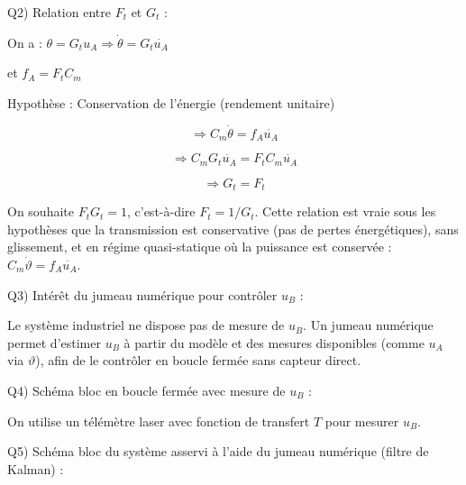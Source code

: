 \documentclass{rapportECL}
\begin{document}
Q2) Relation entre $F_t$ et $G_t$ :

On a : $\theta = G_t u_A \Rightarrow \dot{\theta} = G_t \dot{u_A}$

et $f_A = F_t C_m$

Hypoth\`ese : Conservation de l'\'energie (rendement unitaire)

\[\Rightarrow C_m \dot{\theta} = f_A \dot{u_A}\]

\[\Rightarrow C_m G_t \dot{u_A} = F_t C_m \dot{u_A}\]

\[\Rightarrow G_t = F_t\]

On souhaite $F_t G_t = 1$, c'est-\`a-dire $F_t = 1/G_t$. Cette relation est vraie sous les hypoth\`eses que la transmission est conservative (pas de pertes \'energ\'etiques), sans glissement, et en r\'egime quasi-statique o\`u la puissance est conserv\'ee : $C_m \dot{\vartheta} = f_A \dot{u_A}$.

Q3) Int\'er\^et du jumeau num\'erique pour contr\^oler $u_B$ :

Le syst\`eme industriel ne dispose pas de mesure de $u_B$. Un jumeau num\'erique permet d'estimer $u_B$ \`a partir du mod\`ele et des mesures disponibles (comme $u_A$ via $\vartheta$), afin de le contr\^oler en boucle ferm\'ee sans capteur direct.

Q4) Sch\'ema bloc en boucle ferm\'ee avec mesure de $u_B$ :

On utilise un t\'el\'em\`etre laser avec fonction de transfert $T$ pour mesurer $u_B$.


Q5) Sch\'ema bloc du syst\`eme asservi \`a l'aide du jumeau num\'erique (filtre de Kalman) :
\end{document}
